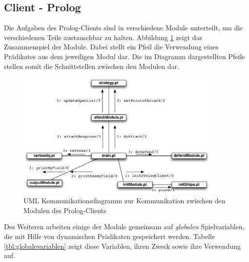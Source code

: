 \subsection{Client - Prolog} \label{sec:Prologclient}
	Die Aufgaben des Prolog-Clients sind in verschiedene Module unterteilt, um die verschiedenen Teile austauschbar zu halten. 
	Abbildung \ref{fig:prologmodule} zeigt das Zusammenspiel der Module. Dabei stellt ein Pfeil die Verwendung eines Prädikates aus
	dem jeweiligen Modul dar. Die im Diagramm dargestellten Pfeile stellen somit die Schnittstellen zwischen den Modulen dar.
	
	\begin{figure}[H] %
		\centering
		\includegraphics[width=0.9\textwidth]{images/ModuleCommunication.pdf}
		\caption{UML Kommunikationsdiagramm zur Kommunikation zwischen den Modulen des Prolog-Clients}
		\label{fig:prologmodule}
	\end{figure}

	Des Weiteren arbeiten einige der Module gemeinsam auf \textit{globalen} Spielvariablen, die mit Hilfe von dynamischen Prädikaten
	gespeichert werden. Tabelle \ref{tbl:globalevariablen} zeigt diese Variablen, ihren Zweck sowie ihre Verwendung auf.
	
